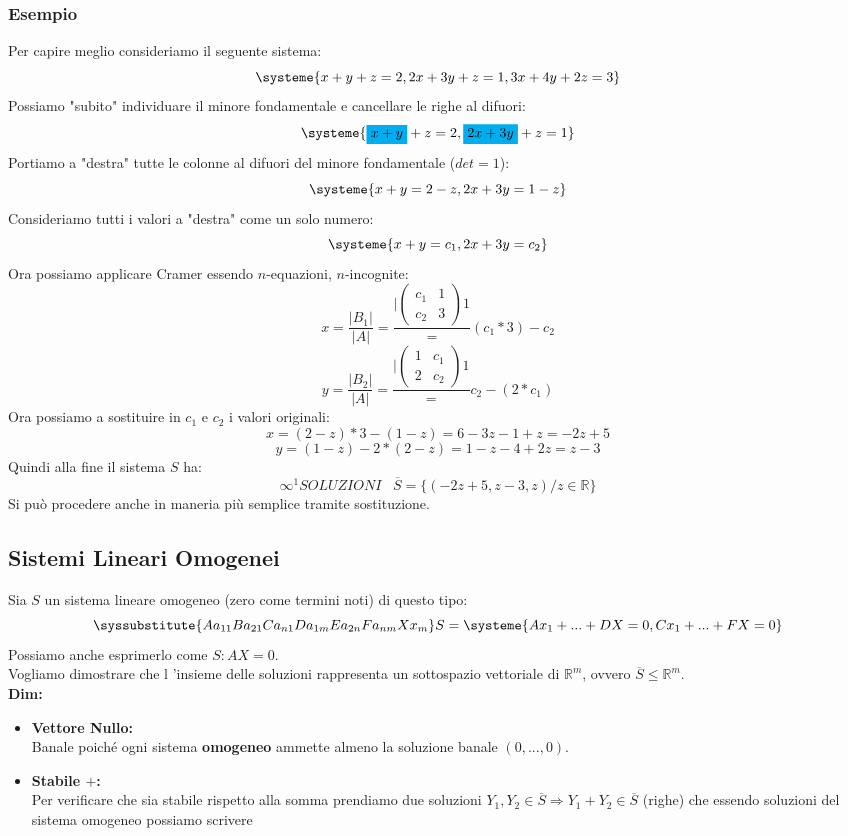 \subsubsection{Esempio}
Per capire meglio consideriamo il seguente sistema:
$$ 
\systeme
{
x+y+z = 2,
2x+3y+z=1,
3x+4y+2z=3
}
$$
Possiamo "subito" individuare il minore fondamentale e cancellare le righe al difuori:
$$ 
\systeme
{
\mathcolorbox{cyan}{x+y}+z = 2,
\mathcolorbox{cyan}{2x+3y}+z=1
}
$$
Portiamo a "destra" tutte le colonne al difuori del minore fondamentale ($det = 1$):
$$ 
\systeme
{
x+y = 2-z,
2x+3y=1-z
}
$$
Consideriamo tutti i valori a "destra" come un solo numero:
$$ 
\systeme
{
x+y = c_1,
2x+3y=c_2
}
$$
Ora possiamo applicare Cramer essendo $n$-equazioni, $n$-incognite:
$$ 
x = \frac{|B_1|}{|A|} = \frac{|\begin{pmatrix}c_1 & 1 \\ c_2 & 3\end{pmatrix}1} = (c_1*3)-c_2
$$
$$
y = \frac{|B_2|}{|A|} = \frac{|\begin{pmatrix}1 & c_1  \\ 2 & c_2\end{pmatrix}1} = c_2-(2*c_1)
$$
Ora possiamo a sostituire in $c_1$ e $c_2$ i valori originali:
$$ x = (2-z)*3 -(1-z) = 6-3z-1+z = -2z +5  $$
$$ y = (1-z)-2*(2-z) = 1-z-4+2z = z-3$$
Quindi alla fine il sistema $S$ ha:
$$ \infty^1 SOLUZIONI \;\;\; \overline{S} = \{(-2z+5,z-3,z)/ z \in \mathbb{R}\}$$
Si può procedere anche in maneria più semplice tramite sostituzione.

\subsection{Sistemi Lineari Omogenei}
Sia $S$ un sistema lineare omogeneo (zero come termini noti) di questo tipo:
$$
\syssubstitute{A{a_{11}}B{a_{21}}C{a_{n1}}D{a_{1m}}E{a_{2n}}F{a_{nm}}X{x_{m}}}
S=
\systeme{
  A x_1 +...+ D X  = 0,
  C x_1 +...+ F X = 0
}
$$
Possiamo anche esprimerlo come $S: AX=0$.\\
Vogliamo dimostrare che l ’insieme delle soluzioni rappresenta un sottospazio vettoriale di $\mathbb{R}^m$, ovvero $\overline{S} \le \mathbb{R}^m$.\\

\textbf{Dim:}
\begin{itemize}
\item[] \textbf{Vettore Nullo:}\\
Banale poiché ogni sistema \textbf{omogeneo} ammette almeno la soluzione banale $(0,...,0)$.
\item[] \textbf{Stabile $+$:}\\
Per verificare che sia stabile rispetto alla somma prendiamo due soluzioni $Y_1,Y_2 \in \overline{S} \Rightarrow Y_1+Y_2 \in \overline{S}$ (righe) che essendo soluzioni del sistema omogeneo possiamo scrivere

\end{itemize}




